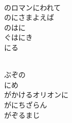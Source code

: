 \documentclass[10pt,b5j]{tarticle} %
\begin{document}
\begin{enumerate}
\begin{minipage}[c]{\blocksize}
    \end{minipage}
    \begin{minipage}[c]{\blocksize}
        
        \vspace{\linespace}
        \item~\\
        のロマンにわれて\\
        のにさまよえば\\
        のはに\\
        ぐはにき\\
        にる
        
    \end{minipage}
    \begin{minipage}[c]{\blocksize}
        
        \vspace{\linespace}
        \item~\\
        ぶぞの\\
        にめ\\
        がかけるオリオンに\\
        がにちざらん\\
        がぞるまじ
    
    \end{minipage}
\end{enumerate} %
\end{document}
